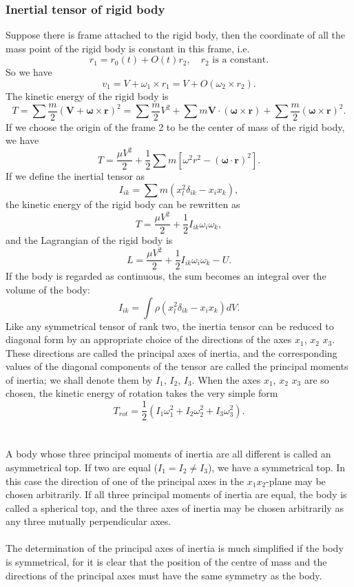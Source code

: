\subsubsection{Inertial tensor of rigid body}
Suppose there is frame attached to the rigid body, then the coordinate of all the mass point of the rigid body is constant in this frame, i.e.
\[r_1 = r_0(t) + O(t)r_2 ,\quad r_2 \mbox{ is a constant}.\]
So we have
\[v_1 = V + \omega_1 \times r_1 = V + O(\omega_2 \times r_2).\]
The kinetic energy of the rigid body is
\[T = \sum \frac{m}{2} (\bm{V} + \bm{\omega} \times \bm{r})^2 = \sum \frac{m}{2} V^2 + \sum m\bm{V}\cdot(\bm{\omega}\times\bm{r}) + \sum \frac{m}{2} (\bm{\omega} \times \bm{r})^2.\]
If we choose the origin of the frame 2 to be the center of mass of the rigid body, we have
\[T = \frac{\mu V^2}{2} + \frac{1}{2}\sum m [\omega^2r^2-(\bm{\omega} \cdot \bm{r})^2].\]
If we define the inertial tensor as
\[I_{ik} = \sum m (x_l^2 \delta_{ik} - x_i x_k),\]
the kinetic energy of the rigid body can be rewritten as
\[T = \frac{\mu V^2}{2} + \frac{1}{2} I_{ik}\omega_i \omega_k ,\]
and the Lagrangian of the rigid body is
\[L = \frac{\mu V^2}{2} + \frac{1}{2} I_{ik}\omega_i \omega_k -U.\]
If the body is regarded as continuous, the sum becomes an integral over the volume of the body:
\[I_{ik} = \int \rho (x_l^2 \delta_{ik} - x_i x_k) dV.\]
Like any symmetrical tensor of rank two, the inertia tensor can be reduced to diagonal form by an appropriate choice of the directions of the axes $x_1$, $x_2$ $x_3$. 
These directions are called the principal axes of inertia, and the corresponding values of the diagonal components of the tensor are called the principal moments of inertia; we shall denote them by $I_1$, $I_2$, $I_3$. 
When the axes $x_1$, $x_2$ $x_3$ are so chosen, the kinetic energy of rotation takes the very simple form
\[T_{rot} = \frac{1}{2} (I_1 \omega_1^2 + I_2 \omega_2^2 + I_3 \omega_3^2).\]
\\ \\
A body whose three principal moments of inertia are all different is called an asymmetrical top. 
If two are equal ($I_1 = I_2 \neq I_3$), we have a symmetrical top. 
In this case the direction of one of the principal axes in the $x_1x_2$-plane may be chosen arbitrarily.
If all three principal moments of inertia are equal, the body is called a spherical top, and the three axes of inertia may be chosen arbitrarily as any three mutually perpendicular axes.
\\ \\
The determination of the principal axes of inertia is much simplified if the body is symmetrical, for it is clear that the position of the centre of mass and the directions of the principal axes must have the same symmetry as the body.
